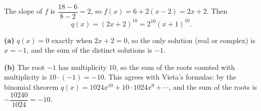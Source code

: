 The slope of $f$ is $\dfrac{18-6}{8-2}=2$, so $f(x)=6+2(x-2)=2x+2$. Then
\[q(x)=(2x+2)^{10}=2^{10}(x+1)^{10}.\]

\textbf{(a)} $q(x)=0$ exactly when $2x+2=0$, so the only solution (real or complex) is $x=-1$, and the sum of the distinct solutions is $\boxed{-1}$.

\textbf{(b)} The root $-1$ has multiplicity $10$, so the sum of the roots counted with multiplicity is $10\cdot(-1)=\boxed{-10}$. This agrees with Vieta's formulas: by the binomial theorem $q(x)=1024x^{10}+10\cdot1024x^9+\cdots$, and the sum of the roots is $-\dfrac{10240}{1024}=-10$.
